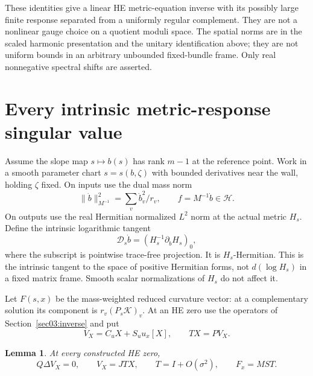 \documentclass[11pt]{amsart}
\newtheorem{lemma}[theorem]{Lemma}
\theoremstyle{definition}
\theoremstyle{remark}
\newcommand{\HH}{\mathcal H}
\newcommand{\cK}{\mathcal K}
\begin{document}
These identities give a linear HE metric-equation inverse with its
possibly large finite response separated from a uniformly regular
complement. They are not a nonlinear gauge choice on a quotient
moduli space. The spatial norms are in the scaled harmonic
presentation and the unitary identification above; they are not
uniform bounds in an arbitrary unbounded fixed-bundle frame.
Only real nonnegative spectral shifts are asserted.

\section{Every intrinsic metric-response singular value}\label{sec04:response}

Assume the slope map \(s\mapsto b(s)\) has rank \(m-1\) at
the reference point. Work in a smooth parameter chart \(s=s(b,\zeta)\)
with bounded derivatives near the wall, holding \(\zeta\) fixed.
On inputs use the dual mass norm
\begin{equation}\label{eq04:input}
 \|\dot b\|_{M^{-1}}^2=\sum_v\dot b_v^2/r_v,
 \qquad f=M^{-1}\dot b\in\HH.
\end{equation}
On outputs use the real Hermitian normalized \(L^2\) norm at the
actual metric \(H_s\). Define the intrinsic logarithmic tangent
\begin{equation}\label{eq04:response}
 \mathscr D_s\dot b=(H_s^{-1}\partial_{\dot b}H_s)_0,
\end{equation}
where the subscript is pointwise trace-free projection. It is
\(H_s\)-Hermitian. This is the intrinsic tangent to the space of
positive Hermitian forms, not \(d(\log H_s)\) in a fixed matrix
frame. Smooth scalar normalizations of \(H_s\) do not affect it.

Let \(F(s,x)\) be the mass-weighted reduced curvature vector: at a
complementary solution its component is
\(r_v(P_s\cK)_v\). At an HE zero use the operators of
Section~\ref{sec03:inverse} and put
\begin{equation}\label{eq04:velocity}
 V_X=C_uX+S_uu_x[X],\qquad TX=PV_X.
\end{equation}

\begin{lemma}\label{lem04:differentiate}
At every constructed HE zero,
\begin{equation}\label{eq04:factorization}
 Q\Delta V_X=0,\qquad V_X=JTX,\qquad
 T=I+O(\sigma^2),\qquad F_x=MST.
\end{equation}
\end{lemma}
\end{document}
